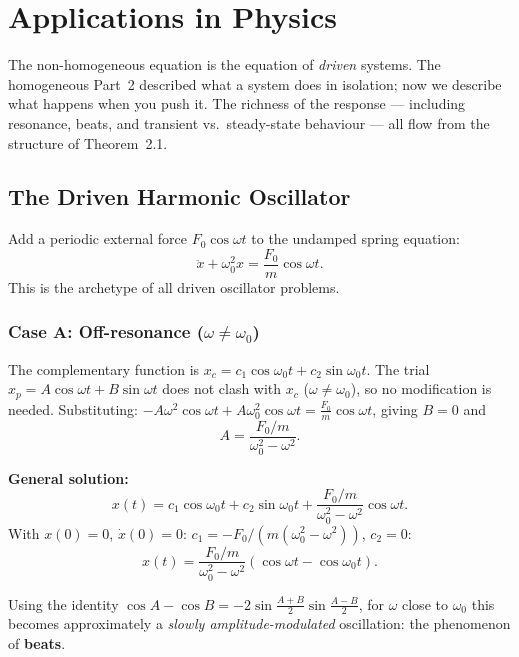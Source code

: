\documentclass[12pt,a4paper]{article}
\begin{document}
\section{Applications in Physics}

The non-homogeneous equation is the equation of \emph{driven} systems. The homogeneous
Part~2 described what a system does in isolation; now we describe what happens when
you push it. The richness of the response --- including resonance, beats, and transient
vs.\ steady-state behaviour --- all flow from the structure of Theorem~2.1.

\subsection{The Driven Harmonic Oscillator}

Add a periodic external force $F_0\cos\omega t$ to the undamped spring equation:
\begin{equation}
  \ddot{x} + \omega_0^2 x = \frac{F_0}{m}\cos\omega t.
  \label{eq:driven}
\end{equation}
This is the archetype of all driven oscillator problems.

\subsubsection*{Case A: Off-resonance ($\omega \neq \omega_0$)}

The complementary function is $x_c = c_1\cos\omega_0 t + c_2\sin\omega_0 t$.
The trial $x_p = A\cos\omega t + B\sin\omega t$ does not clash with $x_c$
($\omega \neq \omega_0$), so no modification is needed.
Substituting: $-A\omega^2\cos\omega t + A\omega_0^2\cos\omega t = \frac{F_0}{m}\cos\omega t$,
giving $B = 0$ and
\[
  A = \frac{F_0/m}{\omega_0^2 - \omega^2}.
\]

\textbf{General solution:}
\[
  x(t) = c_1\cos\omega_0 t + c_2\sin\omega_0 t
          + \frac{F_0/m}{\omega_0^2-\omega^2}\cos\omega t.
\]
With $x(0)=0$, $\dot x(0)=0$: $c_1 = -F_0/(m(\omega_0^2-\omega^2))$, $c_2=0$:
\begin{equation}
  \boxed{x(t) = \frac{F_0/m}{\omega_0^2-\omega^2}(\cos\omega t - \cos\omega_0 t).}
  \label{eq:beats}
\end{equation}

Using the identity $\cos A - \cos B = -2\sin\!\tfrac{A+B}{2}\sin\!\tfrac{A-B}{2}$,
for $\omega$ close to $\omega_0$ this becomes approximately a
\emph{slowly amplitude-modulated} oscillation: the phenomenon of \textbf{beats}.
\end{document}
